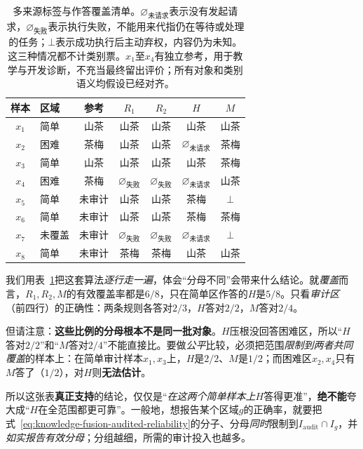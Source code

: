 \begin{table}[htbp]
  \centering
  \small
  \renewcommand{\arraystretch}{1.15}
  \begin{tabular}{@{}clccccc@{}}
    \toprule
    \textbf{样本} & \textbf{区域} & \textbf{参考} & \textbf{$R_1$} & \textbf{$R_2$} & \textbf{$H$} & \textbf{$M$} \\
    \midrule
    $x_1$ & 简单 & 山茶 & 山茶 & 山茶 & 山茶 & 山茶 \\
    $x_2$ & 困难 & 茶梅 & 山茶 & 山茶 & $\varnothing_{\text{未请求}}$ & 茶梅 \\
    $x_3$ & 简单 & 山茶 & 山茶 & 山茶 & 山茶 & 茶梅 \\
    $x_4$ & 困难 & 茶梅 & $\varnothing_{\text{失败}}$ & $\varnothing_{\text{失败}}$ & $\varnothing_{\text{未请求}}$ & 山茶 \\
    \midrule
    $x_5$ & 简单 & 未审计 & 山茶 & 山茶 & 茶梅 & $\bot$ \\
    $x_6$ & 简单 & 未审计 & 山茶 & 山茶 & 茶梅 & 茶梅 \\
    $x_7$ & 未覆盖 & 未审计 & $\varnothing_{\text{失败}}$ & $\varnothing_{\text{失败}}$ & $\varnothing_{\text{未请求}}$ & $\bot$ \\
    $x_8$ & 简单 & 未审计 & 茶梅 & 茶梅 & 山茶 & 山茶 \\
    \bottomrule
  \end{tabular}
  \caption{多来源标签与作答覆盖清单。$\varnothing_{\text{未请求}}$表示没有发起请求，$\varnothing_{\text{失败}}$表示执行失败，不能用来代指仍在等待或处理的任务；$\bot$表示成功执行后主动弃权，内容仍为未知。这三种情况都不计类别票。$x_1$至$x_4$有独立参考，用于教学与开发诊断，不充当最终留出评价；所有对象和类别语义均假设已经对齐。}
  \label{tab:knowledge-fusion-source-records}
\end{table}
\FloatBarrier

我们用表~\ref{tab:knowledge-fusion-source-records}把这套算法\emph{逐行走一遍}，体会“分母不同”会带来什么结论。就\emph{覆盖}而言，$R_1,R_2,M$的有效覆盖率都是$6/8$，只在简单区作答的$H$是$5/8$。只看\emph{审计区}（前四行）的正确性：两条规则各答对$2/3$，$H$答对$2/2$，$M$答对$2/4$。

但请注意：\textbf{这些比例的分母根本不是同一批对象}。$H$压根没回答困难区，所以“$H$答对$2/2$”和“$M$答对$2/4$”不能直接比。要做\emph{公平}比较，必须把范围\emph{限制到两者共同覆盖}的样本上：在简单审计样本$x_1,x_3$上，$H$是$2/2$、$M$是$1/2$；而困难区$x_2,x_4$只有$M$答了（$1/2$），对$H$则\textbf{无法估计}。

所以这张表\textbf{真正支持}的结论，仅仅是“\emph{在这两个简单样本上}$H$答得更准”，\textbf{绝不能}夸大成“$H$在全范围都更可靠”。一般地，想报告某个区域$g$的正确率，就要把式~\eqref{eq:knowledge-fusion-audited-reliability}的分子、分母\emph{同时}限制到$I_{\mathrm{audit}}\cap I_g$，并\emph{如实报告有效分母}；分组越细，所需的审计投入也越多。

